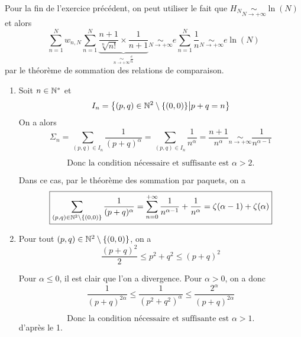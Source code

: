 \begin{remark}
	Pour la fin de l'exercice précédent, on peut utiliser le fait que $H_{N}\underset{N\to+\infty}{\sim}\ln(N)$ et alors 
	$$\sum_{n=1}^{N}w_{n,N}\sum_{n=1}^{N}\underbrace{\frac{n+1}{\sqrt[n]{n!}}\times\frac{1}{n+1}}_{\underset{n\to+\infty}{\sim}\frac{e}{n}}\underset{N\to+\infty}{\sim}e\sum_{n=1}^{N}\frac{1}{n}\underset{N\to+\infty}{\sim}e\ln(N)$$
	par le théorème de sommation des relations de comparaison.
\end{remark}

\begin{solution}
	\phantom{}
	\begin{enumerate}
		\item Soit $n\in\mathbb{N}^{*}$ et 
		$$I_{n}=\left\{(p,q)\in\mathbb{N}^{2}\setminus\{(0,0)\}\middle| p+q=n\right\}$$
		On a alors 
		$$\Sigma_{n}=\sum_{(p,q)\in I_{n}}\frac{1}{(p+q)^{\alpha}}=\sum_{(p,q)\in I_{n}}\frac{1}{n^{\alpha}}=\frac{n+1}{n^{\alpha}}\underset{n\to+\infty}{\sim}\frac{1}{n^{\alpha-1}}$$

		$$\boxed{\text{Donc la condition nécessaire et suffisante est }\alpha>2\text{.}}$$

		Dans ce cas, par le théorème des sommation par paquets, on a 
		$$\boxed{\sum_{(p,q)\in\mathbb{N}^{2}\setminus\{(0,0)\}}\frac{1}{(p+q)^{\alpha}}=\sum_{n=0}^{+\infty}\frac{1}{n^{\alpha-1}}+\frac{1}{n^{\alpha}}=\zeta(\alpha-1)+\zeta(\alpha)}$$

		\item Pour tout $(p,q)\in\mathbb{N}^{2}\setminus\{(0,0)\}$, on a 
		$$\frac{(p+q)^{2}}{2}\leqslant p^{2}+q^{2}\leqslant (p+q)^{2}$$

		Pour $\alpha\leqslant0$, il est clair que l'on a divergence. Pour $\alpha>0$, on a donc 
		$$\frac{1}{(p+q)^{2\alpha}}\leqslant\frac{1}{(p^{2}+q^{2})^{\alpha}}\leqslant\frac{2^{\alpha}}{(p+q)^{2\alpha}}$$
		
		$$\boxed{\text{Donc la condition nécessaire et suffisante est }\alpha>1\text{.}}$$
		d'après le 1.
	\end{enumerate}
\end{solution}